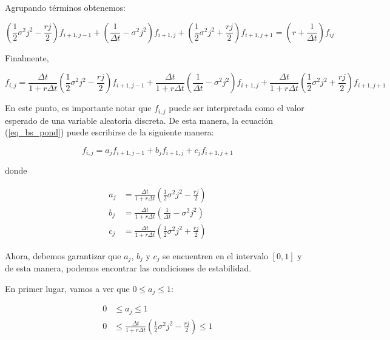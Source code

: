 \documentclass{article}
\begin{document}
Agrupando términos obtenemos: 

\begin{equation*}
    \left( \frac{1}{2} \sigma^{2} j^{2} - \frac{rj}{2} \right) f_{i+1,j-1} + \left( \frac{1}{\Delta t} - \sigma^{2} j^{2} \right) f_{i+1,j} + \left( \frac{1}{2} \sigma^{2} j^{2} + \frac{rj}{2} \right) f_{i+1, j+1} = \left( r + \frac{1}{\Delta t} \right) f_{ij}
\end{equation*}

Finalmente, 

\begin{equation}
\label{eq_bs_pond}
    f_{i,j} = \frac{\Delta t}{1+r\Delta t} \left( \frac{1}{2} \sigma^{2} j^{2} - \frac{rj}{2} \right) f_{i+1,j-1} + \frac{\Delta t}{1+r\Delta t} \left( \frac{1}{\Delta t} - \sigma^{2} j^{2} \right) f_{i+1,j} + \frac{\Delta t}{1+r\Delta t} \left( \frac{1}{2} \sigma^{2} j^{2} + \frac{rj}{2} \right) f_{i+1, j+1} 
\end{equation}

En este punto, es importante notar que $f_{i,j}$ puede ser interpretada como el valor esperado de una variable aleatoria discreta. De esta manera, la ecuación (\ref{eq_bs_pond}) puede escribirse de la siguiente manera: 

\begin{equation}
    f_{i,j} = a_j f_{i+1,j-1} + b_j f_{i+1,j} + c_j f_{i+1, j+1}
\end{equation}

donde 

\begin{equation}
\begin{split}
    a_j &= \frac{\Delta t}{1+r\Delta t} \left( \frac{1}{2} \sigma^{2} j^{2} - \frac{rj}{2} \right) \\ 
    b_j &= \frac{\Delta t}{1+r\Delta t} \left( \frac{1}{\Delta t} - \sigma^{2} j^{2} \right) \\
    c_j &= \frac{\Delta t}{1+r\Delta t} \left( \frac{1}{2} \sigma^{2} j^{2} + \frac{rj}{2} \right)
\end{split}
\end{equation}

\smallskip

Ahora, debemos garantizar que $a_j$, $b_j$ y $c_j$ se encuentren en el intervalo $[0,1]$ y de esta manera, podemos encontrar las condiciones de estabilidad. 

En primer lugar, vamos a ver que {$0 \leq a_j \leq 1$}:

\begin{align*}
    0 &\leq a_j \leq 1 \\
    0 &\leq \frac{\Delta t}{1+r\Delta t} \left( \frac{1}{2} \sigma^{2} j^{2} - \frac{rj}{2} \right) \leq 1
\end{align*}
\end{document}
